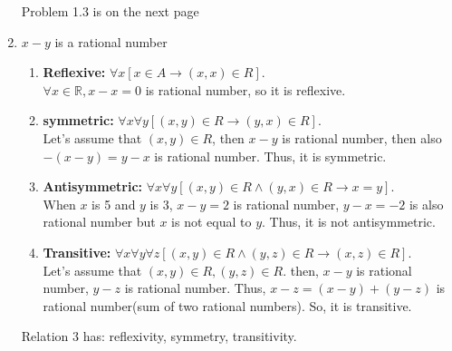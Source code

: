 \begin{enumerate}
    \bigskip\bigskip\bigskip\bigskip\bigskip\bigskip\bigskip
    \begin{flushright}
        \tiny{Problem 1.3 is on the next page}
    \end{flushright}
    \newpage
    \item $x-y$ is a rational number
    \begin{enumerate}
        \item \textbf{Reflexive: } $\forall x [x \in A \to (x, x) \in R]$.\\
        $\forall x \in \mathbb{R}, x - x = 0$ is rational number, so it is reflexive.
        \item \textbf{symmetric: } $\forall x \forall y[(x, y) \in R \to (y, x) \in R]$.\\
        Let's assume that $(x, y) \in R$, then $x - y$ is rational number, then also $-(x - y) = y - x$ is rational number. Thus, it is symmetric.
        \item \textbf{Antisymmetric: } $\forall x \forall y [(x, y) \in R \wedge (y, x) \in R \to x = y]$. \\
        When $x$ is 5 and $y$ is 3, $x - y = 2$ is rational number, $y - x = -2$ is also rational number but $x$ is not equal to $y$. Thus, it is not antisymmetric.
        \item \textbf{Transitive: } $\forall x \forall y \forall z [(x, y) \in R \wedge (y, z) \in R \to (x, z) \in R]$.\\
        Let's assume that $(x, y) \in R, (y, z) \in R$. then, $x - y$ is rational number, $y - z$ is rational number. Thus, $x - z = (x - y) + (y - z)$ is rational number(sum of two rational numbers). So, it is transitive.
    \end{enumerate}
    Relation 3 has: reflexivity, symmetry, transitivity.
\end{enumerate}